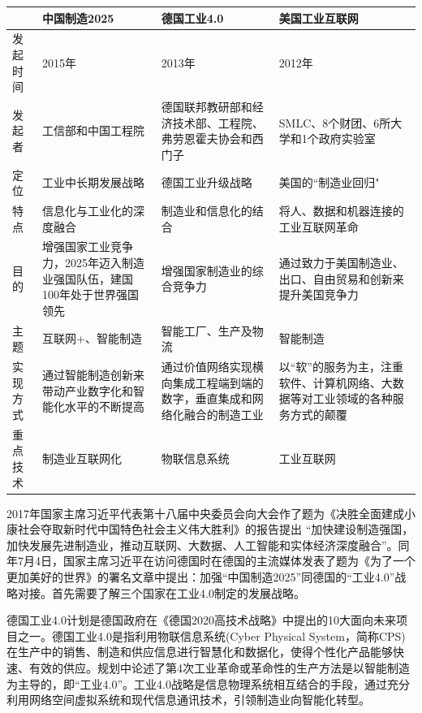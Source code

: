 \begin{table}[htbp]  %
\linespread{0.5} 
\centering  %
\label{tab1:g40}
\begin{tabular}{lp{4.2cm}p{4.2cm}p{4.2cm}}  %

 
\midrule
&中国制造2025&德国工业4.0&美国工业互联网\\[0.5ex]
\hline
发起时间&2015年&2013年&2012年\\[0.5ex]

发起者&工信部和中国工程院&德国联邦教研部和经济技术部、工程院、弗劳恩霍夫协会和西门子&SMLC、8个财团、6所大学和1个政府实验室\\[0.5ex]


定位&工业中长期发展战略&德国工业升级战略
&美国的“制造业回归"\\[0.5ex]

特点&信息化与工业化的深度融合	&制造业和信息化的结合&将人、数据和机器连接的工业互联网革命\\[0.5ex]
目的&增强国家工业竞争力，2025年迈入制造业强国队伍，建国100年处于世界强国领先&增强国家制造业的综合竞争力&通过致力于美国制造业、出口、自由贸易和创新来提升美国竞争力\\[0.5ex]

主题&互联网+、智能制造&智能工厂、生产及物流&智能制造\\[0.5ex]
实现方式&通过智能制造创新来带动产业数字化和智能化水平的不断提高&通过价值网络实现横向集成工程端到端的数字，垂直集成和网络化融合的制造工业&以“软”的服务为主，注重软件、计算机网络、大数据等对工业领域的各种服务方式的颠覆\\[0.5ex]

重点技术&	制造业互联网化&物联信息系统&工业互联网\\[0.5ex]
\bottomrule
\end{tabular}
\end{table}
   
2017年国家主席习近平代表第十八届中央委员会向大会作了题为《决胜全面建成小康社会夺取新时代中国特色社会主义伟大胜利》的报告提出 “加快建设制造强国，加快发展先进制造业，推动互联网、大数据、人工智能和实体经济深度融合”\cite{xjp2017}。同年7月4日，国家主席习近平在访问德国时在德国的主流媒体发表了题为《为了一个更加美好的世界》的署名文章中提出：加强“中国制造2025”同德国的“工业4.0”战略对接\cite{mxn2017}。首先需要了解三个国家在工业4.0制定的发展战略。

德国工业4.0计划是德国政府在《德国2020高技术战略》中提出的10大面向未来项目之一\cite{dc2014}。德国工业4.0是指利用物联信息系统(Cyber Physical System，简称CPS)在生产中的销售、制造和供应信息进行智慧化和数据化，使得个性化产品能够快速、有效的供应。规划中论述了第4次工业革命或革命性的生产方法是以智能制造为主导的，即“工业4.0”。工业4.0战略是信息物理系统相互结合的手段，通过充分利用网络空间虚拟系统和现代信息通讯技术，引领制造业向智能化转型。


